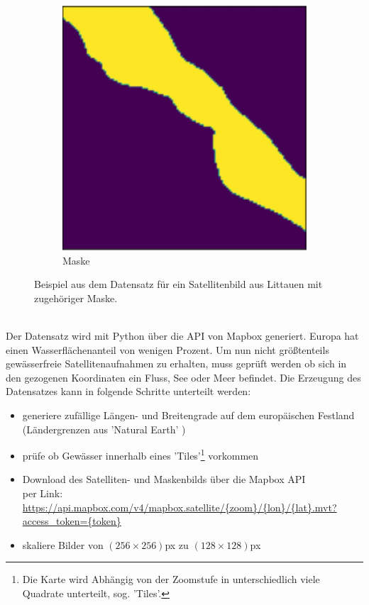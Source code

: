 \begin{figure}
\begin{subfigure}{0.2\textwidth}
        \includegraphics[width=\textwidth]{content/img/datensatz_mask.jpg}
        \caption{Maske}
    \end{subfigure}
    \caption{Beispiel aus dem Datensatz für ein Satellitenbild aus Littauen mit zugehöriger Maske.\cite{mapbox}\cite{openstreetmap}}
    \label{fig:datensatz}
\end{figure}
\\
Der Datensatz wird mit Python über die API von Mapbox\cite{mapbox} generiert.
Europa hat einen Wasserflächenanteil von wenigen Prozent.
Um nun nicht größtenteils gewässerfreie Satellitenaufnahmen zu erhalten, muss geprüft werden ob sich in den gezogenen Koordinaten ein Fluss, See oder Meer befindet.
Die Erzeugung des Datensatzes kann in folgende Schritte unterteilt werden:
\begin{itemize}
    \item generiere zufällige Längen- und Breitengrade auf dem europäischen Festland (Ländergrenzen aus 'Natural Earth' \cite{naturalearth})
    \item prüfe ob Gewässer innerhalb eines 'Tiles'\footnote{\label{foot:tiles}Die Karte wird Abhängig von der Zoomstufe in unterschiedlich viele Quadrate unterteilt, sog. 'Tiles'.} vorkommen
    \item Download des Satelliten- und Maskenbilds über die Mapbox API\cite{mapbox} \\
          per Link: \url{https://api.mapbox.com/v4/mapbox.satellite/{zoom}/{lon}/{lat}.mvt?access_token={token}}
    \item skaliere Bilder von $(256 \times 256)$px zu $(128 \times 128)$px
\end{itemize}
